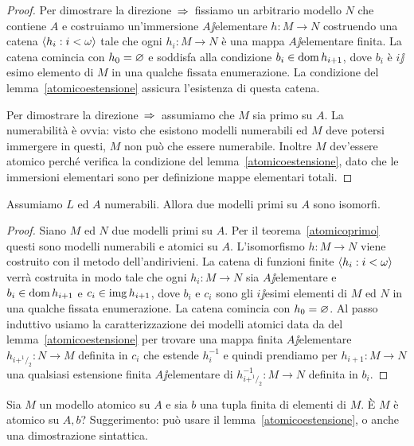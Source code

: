 \begin{proof}
Per dimostrare la direzione $\,\Rightarrow\,$ fissiamo un arbitrario modello $N$ che contiene $A$ e costruiamo un'immersione $A\jj$elementare $h:M\to N$ costruendo una catena $\langle h_i:i<\omega\rangle$ tale che ogni $h_i:M\to N$ \`e una mappa $A\jj$elementare finita. La catena comincia con $h_0=\varnothing$ e soddisfa alla condizione $b_i\in\mathop{\rm dom} h_{i+1}$, dove $b_i$ \`e $i\jj$esimo elemento di $M$ in una qualche fissata enumerazione. La condizione  del lemma~\ref{atomicoestensione} assicura l'esistenza di questa catena. 

Per dimostrare la direzione $\,\Rightarrow\,$ assumiamo che $M$ sia primo su $A$. La numerabilit\`a \`e ovvia: visto che esistono modelli numerabili ed $M$ deve potersi immergere in questi, $M$ non pu\`o che essere numerabile. Inoltre $M$ dev'essere atomico perch\'e verifica la condizione  del lemma~\ref{atomicoestensione}, dato che le immersioni elementari sono per definizione mappe elementari totali.
\end{proof}

\begin{theorem}\label{primiisomorfi}
Assumiamo $L$ ed $A$ numerabili. Allora due modelli primi su $A$ sono isomorfi.
\end{theorem}

\begin{proof} 
Siano $M$ ed $N$ due modelli primi su $A$. Per il teorema~\ref{atomicoprimo} questi sono modelli numerabili e atomici su $A$.  L'isomorfismo $h:M\to N$ viene costruito con il metodo dell'andirivieni. La catena di funzioni finite $\langle h_i:i<\omega\rangle$ verr\`a costruita in modo tale che ogni $h_i:M\to N$ sia $A\jj$elementare e $b_i\in\mathop{\rm dom} h_{i+1}$ e $c_i\in\mathop{\rm img} h_{i+1}$, dove $b_i$ e $c_i$ sono gli $i\jj$esimi elementi di $M$ ed $N$ in una qualche fissata enumerazione. La catena comincia con $h_0=\varnothing$. Al passo induttivo usiamo la caratterizzazione dei modelli atomici data da  del lemma~\ref{atomicoestensione} per trovare una mappa finita $A\jj$elementare $h_{i+^1\!/_2}:N\to M$ definita in $c_i$ che estende $h^{-1}_i$ e quindi prendiamo per $h_{i+1}:M\to N$ una qualsiasi estensione finita $A\jj$elementare di $h_{i+^1\!/_2}^{-1}:M\to N$ definita in $b_i$.
\end{proof}

\begin{exercise}
Sia $M$ un modello atomico su $A$ e sia $b$ una tupla finita di elementi di $M$. \`E $M$ \`e atomico su $A,b$? Suggerimento: pu\`o usare il lemma~\ref{atomicoestensione}, o anche una dimostrazione sintattica.\QED
\end{exercise}

